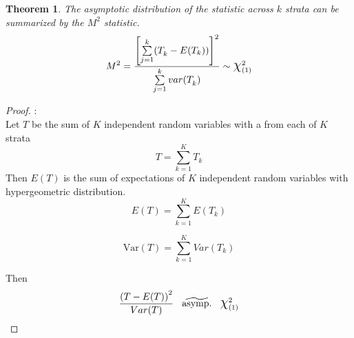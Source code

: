 \documentclass[12pt,oneside]{report}
\newtheorem{theorem}[fact]{Theorem}
\theoremstyle{definition}
\theoremstyle{mystyle}
\begin{document}
\begin{theorem}
	The asymptotic distribution of the statistic  across $k$ strata  can be summarized by the $M^2$ statistic.\\

\begin{equation}
M^2=\displaystyle\frac{\left[\sum\limits_{j=1}^{k}( T_{k}^{}-E(T_{k}))\right]^2   }{\sum\limits_{j=1}^{k}var(T_{k}^{})}\sim \mbox{\Large$\chi$}^{2}_{(1)}
\end{equation}
\end{theorem}
\begin{proof}:\\
	Let $T$ be the sum of $K$ independent random variables with a from each of $K$ strata\\
	\begin{equation*}
	T=\sum\limits_{k=1}^{K} T_{k}
	\end{equation*}
	Then $E(T)$ is the sum of expectations of $K$ independent random variables with hypergeometric distribution.\\
	\begin{equation*}
	E(T)=\displaystyle \sum\limits_{k=1}^{K}E(T_{k})
	\end{equation*}
	
	
	
	\begin{equation*}
	\text{Var}(T)=\displaystyle \sum\limits_{k=1}^{K}Var(T_{k})
	\end{equation*}
	
	
	Then 
	\begin{equation*}
	\displaystyle\frac{\left(T-E(T)\right)^{2}}{Var(T)} \hspace{3mm} \widetilde{\text{asymp.}} \hspace{3mm} \mbox{\Large$\chi$}^{2}_{(1)}
	\end{equation*}
\end{proof}
\end{document}
